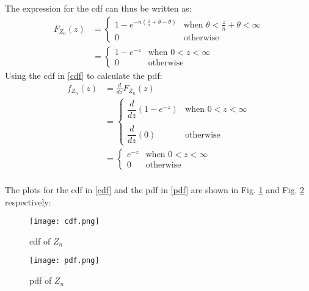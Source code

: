 \documentclass[journal,12pt,twocolumn]{IEEEtran}
\providecommand{\brak}[1]{\ensuremath{\left(#1\right)}}
\theoremstyle{remark}
\numberwithin{equation}{subsection}
\begin{document}
The expression for the cdf can thus be written as:
\begin{align}
    F_{Z_n}(z) &=\nonumber
    \begin{cases}
    1-e^{-n\brak{\frac{z}{n}+\theta-\theta}}&\text{when } \theta<\frac{z}{n}+\theta<\infty\\
    0&\text{otherwise}
    \end{cases}\\
    &= \begin{cases}
    1-e^{-z}&\text{when } 0<z<\infty\\
    0 &\text{otherwise}\label{cdf}
    \end{cases}
\end{align}
Using the cdf in \eqref{cdf} to calculate the pdf:\\
\begin{align}
    f_{Z_n}(z) &= \frac{d}{dz}F_{Z_n}(z)\\
    &= \begin{cases}
    \dfrac{d}{dz}\brak{1-e^{-z}}&\text{when } 0<z<\infty\\\\
    \dfrac{d}{dz}\brak{0}&\text{otherwise}
    \end{cases}\nonumber\\
    &=\begin{cases}
    e^{-z}&\text{when } 0<z<\infty\\
    0&\text{otherwise}
    \end{cases}\label{pdf}
\end{align}
\\The plots for the cdf in \eqref{cdf} and the pdf in \eqref{pdf} are shown in Fig. \ref{fig_cdf} and Fig. \ref{fig_pdf} respectively:
\begin{figure}[H]
    \centering
    \texttt{[image: cdf.png]}
    \caption{cdf of $Z_n$}
    \label{fig_cdf}
\end{figure}
\begin{figure}[H]
    \centering
    \texttt{[image: pdf.png]}
    \caption{pdf of $Z_n$}
    \label{fig_pdf}
\end{figure}
\end{document}
